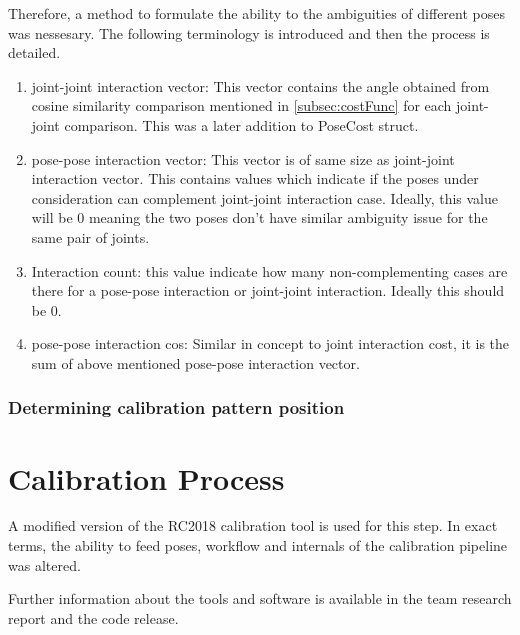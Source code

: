 \documentclass[english, printversion, nomenclature, notitle]{tuvisionthesis} %
\begin{document}
Therefore, a method to formulate the ability to the ambiguities of different poses was nessesary. The following terminology is introduced and then the process is detailed.
 
 \begin{enumerate}
 	\item joint-joint interaction vector: This vector contains the angle obtained from cosine similarity comparison mentioned in \cref{subsec:costFunc} for each joint-joint comparison. This was a later addition to PoseCost struct.
 	\item pose-pose interaction vector: This vector is of same size as joint-joint interaction vector. This contains values which indicate if the poses under consideration can complement joint-joint interaction case. Ideally, this value will be 0 meaning the two poses don't have similar ambiguity issue for the same pair of joints.
 	\item Interaction count: this value indicate how many non-complementing cases are there for a pose-pose interaction or joint-joint interaction. Ideally this should be 0.
 	\item pose-pose interaction cos: Similar in concept to joint interaction cost, it is the sum of above mentioned pose-pose interaction vector.
 \end{enumerate}




\subsubsection{Determining calibration pattern position}

\section{Calibration Process}
A modified version of the RC2018 calibration tool is used for this step. In exact terms, the ability to feed poses, workflow and internals of the calibration pipeline was altered.

Further information about the tools and software is available in the team research report and the code release. 

\end{document}
